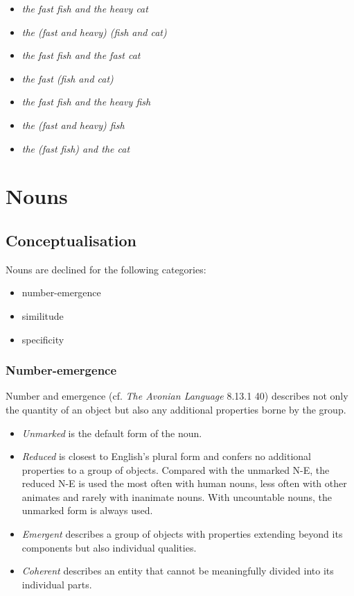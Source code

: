 \documentclass{book}
\begin{document}
\begin{itemize}
  \item {} \emph{the fast fish and the heavy cat}
  \item {} \emph{the (fast and heavy) (fish and cat)}
  \item {} \emph{the fast fish and the fast cat}
  \item {} \emph{the fast (fish and cat)}
  \item {} \emph{the fast fish and the heavy fish}
  \item {} \emph{the (fast and heavy) fish}
  \item {} \emph{the (fast fish) and the cat}
\end{itemize}

\chapter{Nouns}

\section{Conceptualisation}

Nouns are declined for the following categories:

\begin{itemize}
  \item number-emergence
  \item similitude
  \item specificity
\end{itemize}

\subsection{Number-emergence}

Number and emergence (cf. \emph{The Avonian Language} 8.13.1 40) describes not only the quantity of an object but also any additional properties borne by the group.

\begin{itemize}
  \item \emph{Unmarked} is the default form of the noun.
  \item \emph{Reduced} is closest to English's plural form and confers no additional properties to a group of objects. Compared with the unmarked N-E, the reduced N-E is used the most often with human nouns, less often with other animates and rarely with inanimate nouns. With uncountable nouns, the unmarked form is always used.
  \item \emph{Emergent} describes a group of objects with properties extending beyond its components but also individual qualities.
  \item \emph{Coherent} describes an entity that cannot be meaningfully divided into its individual parts.
\end{itemize}
\end{document}
